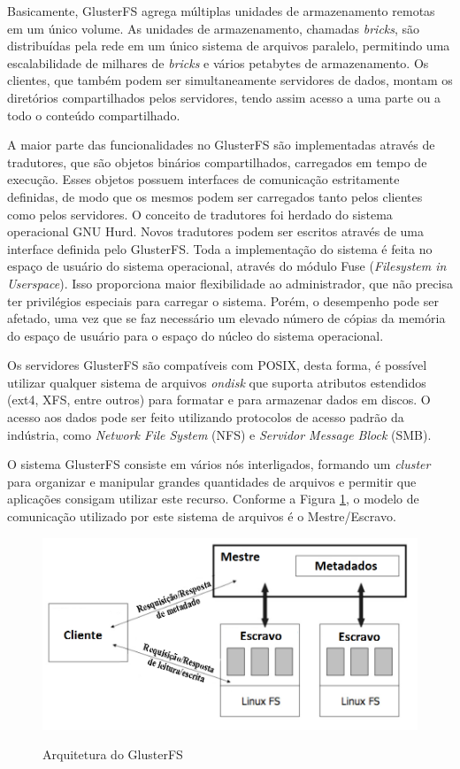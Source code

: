 Basicamente, GlusterFS agrega múltiplas unidades de armazenamento remotas em um único volume. As unidades de armazenamento, chamadas \textit{bricks}, são distribuídas pela rede em um único sistema de arquivos paralelo, permitindo uma escalabilidade de milhares de \textit{bricks} e vários petabytes de armazenamento. Os clientes, que também podem ser simultaneamente servidores de dados, montam os diretórios compartilhados pelos servidores, tendo assim acesso a uma parte ou a todo o conteúdo compartilhado.

A maior parte das funcionalidades no GlusterFS são implementadas através de tradutores, que são objetos binários compartilhados, carregados em tempo de execução. Esses objetos possuem interfaces de comunicação estritamente definidas, de modo que os mesmos podem ser carregados tanto pelos clientes como pelos servidores. O conceito de tradutores foi herdado do sistema operacional GNU Hurd. Novos tradutores podem ser escritos através de uma interface definida pelo GlusterFS. Toda a implementação do sistema é feita no espaço de usuário do sistema operacional, através do módulo Fuse (\textit{Filesystem in Userspace}). Isso proporciona maior flexibilidade ao administrador, que não precisa ter privilégios especiais para carregar o sistema. Porém, o desempenho pode ser afetado, uma vez que se faz necessário um elevado número de cópias da memória do espaço de usuário para o espaço do núcleo do sistema operacional.

Os servidores GlusterFS são compatíveis com POSIX, desta forma, é possível utilizar qualquer sistema de arquivos \textit{ondisk} que suporta atributos estendidos (ext4, XFS, entre outros) para formatar e para armazenar dados em discos. O acesso aos dados pode ser feito utilizando protocolos de acesso padrão da indústria, como \textit{Network File System} (NFS) e \textit{Servidor Message Block} (SMB).

O sistema GlusterFS consiste em vários nós interligados, formando um \textit{cluster} para organizar e manipular grandes quantidades de arquivos e permitir que aplicações consigam utilizar este recurso. Conforme a Figura \ref{fig:glusterArq}, o modelo de comunicação utilizado por este sistema de arquivos é o Mestre/Escravo.

    \begin{figure}[htb]
    \centering
    \includegraphics[scale=0.50]{imagens/GlusterFSArq.png}
    \caption{Arquitetura do GlusterFS} \cite{Roman2012}
    \label{fig:glusterArq}
    \end{figure}    

